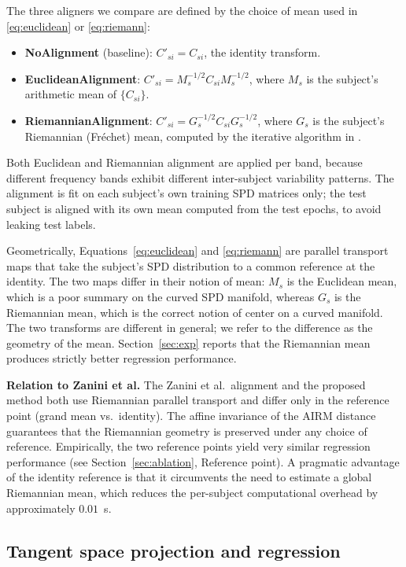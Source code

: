 \documentclass[journal,twoside,web]{ieeecolor2}
\begin{document}
The three aligners we compare are defined by the choice of mean used
in \eqref{eq:euclidean} or \eqref{eq:riemann}:
\begin{itemize}
\item \textbf{NoAlignment} (baseline): $C'_{si} = C_{si}$, the
identity transform.
\item \textbf{EuclideanAlignment}: $C'_{si} = M_s^{-1/2} C_{si}
M_s^{-1/2}$, where $M_s$ is the subject's arithmetic mean of
$\{C_{si}\}$.
\item \textbf{RiemannianAlignment}: $C'_{si} = G_s^{-1/2} C_{si}
G_s^{-1/2}$, where $G_s$ is the subject's Riemannian (Fr\'echet) mean,
computed by the iterative algorithm in \cite{barachant2010lvaica, barachant2012tbme}.
\end{itemize}
Both Euclidean and Riemannian alignment are applied per band, because
different frequency bands exhibit different inter-subject variability
patterns. The alignment is fit on each subject's own training SPD
matrices only; the test subject is aligned with its own mean computed
from the test epochs, to avoid leaking test labels.

Geometrically, Equations~\eqref{eq:euclidean} and \eqref{eq:riemann}
are parallel transport maps that take the subject's SPD distribution
to a common reference at the identity. The two maps differ in their
notion of mean: $M_s$ is the Euclidean mean, which is a poor summary
on the curved SPD manifold, whereas $G_s$ is the Riemannian mean,
which is the correct notion of center on a curved manifold. The two
transforms are different in general; we refer to the difference as
the geometry of the mean. Section~\ref{sec:exp} reports that the
Riemannian mean produces strictly better regression performance.

\noindent\textbf{Relation to Zanini et al.}
The Zanini et al.\ alignment \cite{zanini2018} and the proposed method
both use Riemannian parallel transport and differ only in the reference
point (grand mean vs.\ identity). The affine invariance of the AIRM
distance guarantees that the Riemannian geometry is preserved under any
choice of reference. Empirically, the two reference points yield very
similar regression performance (see Section~\ref{sec:ablation},
Reference point). A pragmatic advantage of the identity reference is
that it circumvents the need to estimate a global Riemannian mean,
which reduces the per-subject computational overhead by approximately
$0.01$~s.

\subsection{Tangent space projection and regression}
\end{document}

